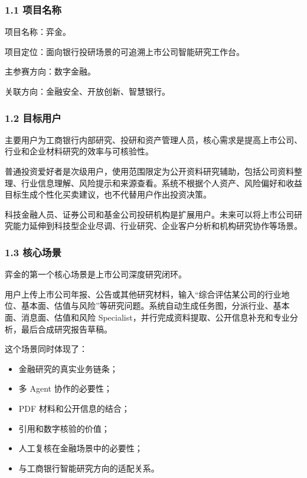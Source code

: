 \documentclass[a4paper,12pt,fontset=none]{ctexart}
\begin{document}
\subsubsection{1.1 项目名称}\label{ux9879ux76eeux540dux79f0}

项目名称：弈金。

项目定位：面向银行投研场景的可追溯上市公司智能研究工作台。

主参赛方向：数字金融。

关联方向：金融安全、开放创新、智慧银行。

\subsubsection{1.2 目标用户}\label{ux76eeux6807ux7528ux6237}

主要用户为工商银行内部研究、投研和资产管理人员，核心需求是提高上市公司、行业和企业材料研究的效率与可核验性。

普通投资爱好者是次级用户，使用范围限定为公开资料研究辅助，包括公司资料整理、行业信息理解、风险提示和来源查看。系统不根据个人资产、风险偏好和收益目标生成个性化买卖建议，也不代替用户作出投资决策。

科技金融人员、证券公司和基金公司投研机构是扩展用户。未来可以将上市公司研究能力延伸到科技型企业尽调、行业研究、企业客户分析和机构研究协作等场景。

\subsubsection{1.3 核心场景}\label{ux6838ux5fc3ux573aux666f}

弈金的第一个核心场景是上市公司深度研究闭环。

用户上传上市公司年报、公告或其他研究材料，输入``综合评估某公司的行业地位、基本面、估值与风险''等研究问题。系统自动生成任务图，分派行业、基本面、消息面、估值和风险
Specialist，并行完成资料提取、公开信息补充和专业分析，最后合成研究报告草稿。

这个场景同时体现了：

\begin{itemize}
\tightlist
\item
  金融研究的真实业务链条；
\item
  多 Agent 协作的必要性；
\item
  PDF 材料和公开信息的结合；
\item
  引用和数字核验的价值；
\item
  人工复核在金融场景中的必要性；
\item
  与工商银行智能研究方向的适配关系。
\end{itemize}
\end{document}
